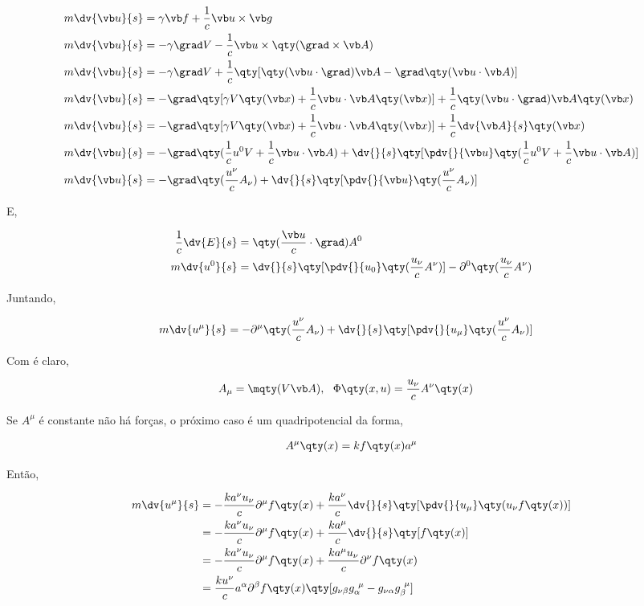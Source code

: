 \documentclass[twoside]{amsart}
\numberwithin{equation}{section}
\begin{document}
\begin{refsection}
\begin{align}
    m\dv{\vb u}{s}&=\gamma\vb f+\frac1c\vb u\times\vb g\\
    m\dv{\vb u}{s}&=-\gamma\grad V-\frac1c\vb u\times\qty(\grad\times \vb A)\\
    m\dv{\vb u}{s}&=-\gamma\grad V+\frac1c\qty[\qty(\vb u\cdot\grad) \vb A-\grad\qty(\vb u\cdot \vb A)]\\
    m\dv{\vb u}{s}&=-\grad \qty[\gamma V\qty(\vb x)+\frac1c\vb u\cdot \vb A\qty(\vb x)]+\frac1c\qty(\vb u\cdot\grad) \vb A\qty(\vb x)\\
    m\dv{\vb u}{s}&=-\grad \qty[\gamma V\qty(\vb x)+\frac1c\vb u\cdot \vb A\qty(\vb x)]+\frac1c\dv{\vb A}{s}\qty(\vb x)\\
    m\dv{\vb u}{s}&=-\grad \qty(\frac1cu^0 V+\frac1c\vb u\cdot \vb A)+\dv{}{s}\qty[\pdv{}{\vb u}\qty(\frac1cu^0V+\frac1c\vb u\cdot \vb A)]\\
    m\dv{\vb u}{s}&=-\grad\qty( \frac{u^\nu}{c} A_\nu)+\dv{}{s}\qty[\pdv{}{\vb u}\qty(\frac{u^\nu}{c} A_\nu)]
\end{align}

E,

\begin{align}
    \frac1c\dv{E}{s}&=\qty(\frac{\vb u}{c}\cdot \grad)A^0\\
    m\dv{u^0}{s}&=\dv{}{s}\qty[\pdv{}{u_0}\qty(\frac{u_\nu}{c} A^\nu)]-\partial^0\qty(\frac{u_\nu}{c} A^\nu)
\end{align}

Juntando,

\begin{align}
    m\dv{u^\mu}{s}&=-\partial^\mu\qty(\frac{u^\nu}{c} A_\nu)+\dv{}{s}\qty[\pdv{}{u_\mu}\qty(\frac{u^\nu}{c} A_\nu)]
\end{align}

Com é claro,

\begin{align}
    A_\mu=\mqty( V&\vb A),\ \ \Phi\qty(x,u)=\frac{u_\nu}{c} A^\nu\qty(x)
\end{align}

Se $A^\mu$ é constante não há forças, o próximo caso é um quadripotencial da forma,

\begin{align}
    A^\mu\qty(x)=kf\qty(x)a^\mu
\end{align}

Então,

\begin{align}
    m\dv{u^\mu}{s}&=-\frac{ka^\nu u_\nu}{c}\partial^\mu f\qty(x)+\frac {ka^\nu}{c}\dv{}{s}\qty[\pdv{}{u_\mu}\qty(u_\nu f\qty(x))]\\
    &=-\frac{ka^\nu u_\nu}{c} \partial^\mu f\qty(x)+\frac {ka^\mu}{c}\dv{}{s}\qty[f\qty(x)]\\
    &=-\frac{ka^\nu u_\nu}{c} \partial^\mu f\qty(x)+\frac {ka^\mu u_\nu}{c}\partial^\nu f\qty(x)\\
    &=\frac{ku^\nu}{c}a^\alpha \partial^\beta f\qty(x)\qty[g_{\nu\beta}g_\alpha^{\ \mu}-g_{\nu\alpha}g_\beta^{\ \mu}]
\end{align}


\end{refsection}
\end{document}
